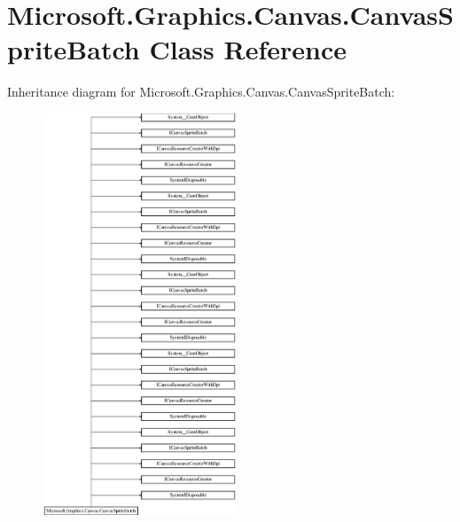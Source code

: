 \hypertarget{class_microsoft_1_1_graphics_1_1_canvas_1_1_canvas_sprite_batch}{}\section{Microsoft.\+Graphics.\+Canvas.\+Canvas\+Sprite\+Batch Class Reference}
\label{class_microsoft_1_1_graphics_1_1_canvas_1_1_canvas_sprite_batch}
Inheritance diagram for Microsoft.\+Graphics.\+Canvas.\+Canvas\+Sprite\+Batch\+:\begin{figure}[H]
\begin{center}
\leavevmode
\includegraphics[height=12.000000cm]{class_microsoft_1_1_graphics_1_1_canvas_1_1_canvas_sprite_batch}
\end{center}
\end{figure}
